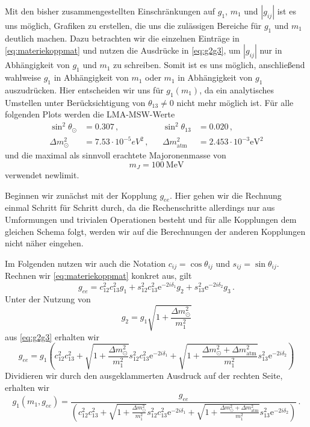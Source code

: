 Mit den bisher zusammengestellten Einschränkungen auf $g_1$, $m_1$ und $|g_{i j}|$ ist es uns möglich, Grafiken zu erstellen, die uns die zulässigen Bereiche für $g_1$ und $m_1$ deutlich machen.
Dazu betrachten wir die einzelnen Einträge in \eqref{eq:materiekoppmat} und nutzen die Ausdrücke in \eqref{eq:g2g3}, um $|g_{i j}|$ nur in Abhängigkeit von $g_1$ und $m_1$ zu schreiben.
Somit ist es uns möglich, anschließend wahlweise $g_1$ in Abhängigkeit von $m_1$ oder $m_1$ in Abhängigkeit von $g_1$ auszudrücken.
Hier entscheiden wir uns für $g_1 (m_1)$, da ein analytisches Umstellen unter Berücksichtigung von $\theta_{1 3} \neq 0$ nicht mehr möglich ist.
Für alle folgenden Plots werden die LMA-MSW-Werte
\begin{align}
    \sin^2\theta_\odot &= \num{0.307}\,, && \sin^2\theta_{13} &= \num{0.020}\,, \\ \Delta m^2_\odot &= \num{7.53} \cdot 10^{-5} \si{eV}^2\,, && \Delta m^2_\text{atm} &= \num{2.453} \cdot 10^{-3} \si{\eV}^2
    \label{eq:LMAMSW}
\end{align}
und die maximal als sinnvoll erachtete Majoronenmasse von 
\begin{equation}
    m_J = \SI{100}{\mega\eV}
\end{equation}
verwendet \cite{neutrinospdg}{newlimit}.

Beginnen wir zunächst mit der Kopplung $g_{ee}$.
Hier gehen wir die Rechnung einmal Schritt für Schritt durch, da die Rechenschritte allerdings nur aus Umformungen und trivialen Operationen besteht und für alle Kopplungen dem gleichen Schema folgt, werden wir auf die Berechnungen der anderen
Kopplungen nicht näher eingehen.

Im Folgenden nutzen wir auch die Notation $c_{ij} = \cos{\theta_{ij}}$ und $s_{ij} = \sin{\theta_{ij}}$.
Rechnen wir \eqref{eq:materiekoppmat} konkret aus, gilt
\begin{equation}
    g_{ee} = c^2_{1 2} c^2_{1 3} g_1 + s^2_{12} c^2_{13} \mathrm{e}^{-2 i \delta_1} g_2 + s^2_{13} \mathrm{e}^{-2 i \delta_2}  g_3 \,.
    \label{eq:g_ee}
\end{equation}
Unter der Nutzung von
\begin{equation*}
    g_2 = g_1 \sqrt{1 + \frac{\Delta m^2_\odot}{m^2_1}}
\end{equation*}
aus \eqref{eq:g2g3} erhalten wir
\begin{equation*}
    g_{ee} = g_1 \left(c^2_{1 2} c^2_{1 3} + \sqrt{1 + \frac{\Delta m^2_\odot}{m^2_1}}s^2_{12} c^2_{13} \mathrm{e}^{-2 i \delta_1} + \sqrt{1 + \frac{\Delta m^2_\odot + \Delta m^2_\text{atm}}{m^2_1}} s^2_{13} \mathrm{e}^{-2 i \delta_2}\right)
\end{equation*}
Dividieren wir durch den ausgeklammerten Ausdruck auf der rechten Seite, erhalten wir
\begin{equation}
    g_1(m_1,g_{ee}) = \frac{g_{ee}}{\left(c^2_{1 2} c^2_{1 3} + \sqrt{1 + \frac{\Delta m^2_\odot}{m^2_1}}s^2_{12} c^2_{13} \mathrm{e}^{-2 i \delta_1} + \sqrt{1 + \frac{\Delta m^2_\odot + \Delta m^2_\text{atm}}{m^2_1}} s^2_{13} \mathrm{e}^{-2 i \delta_2}\right)} \,.
    \label{eq:g_1g_ee}
\end{equation}

